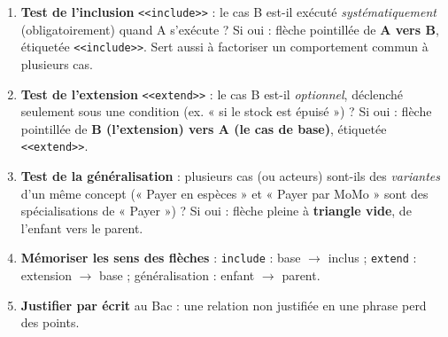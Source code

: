 \documentclass[11pt]{article}
\begin{document}
\begin{methode}
\begin{enumerate}
\item \textbf{Test de l'inclusion} \texttt{<<include>>} : le cas B est-il exécuté \emph{systématiquement} (obligatoirement) quand A s'exécute ? Si oui : flèche pointillée de \textbf{A vers B}, étiquetée \texttt{<<include>>}. Sert aussi à factoriser un comportement commun à plusieurs cas.
\item \textbf{Test de l'extension} \texttt{<<extend>>} : le cas B est-il \emph{optionnel}, déclenché seulement sous une condition (ex. « si le stock est épuisé ») ? Si oui : flèche pointillée de \textbf{B (l'extension) vers A (le cas de base)}, étiquetée \texttt{<<extend>>}.
\item \textbf{Test de la généralisation} : plusieurs cas (ou acteurs) sont-ils des \emph{variantes} d'un même concept (« Payer en espèces » et « Payer par MoMo » sont des spécialisations de « Payer ») ? Si oui : flèche pleine à \textbf{triangle vide}, de l'enfant vers le parent.
\item \textbf{Mémoriser les sens des flèches} : \texttt{include} : base $\rightarrow$ inclus ; \texttt{extend} : extension $\rightarrow$ base ; généralisation : enfant $\rightarrow$ parent.
\item \textbf{Justifier par écrit} au Bac : une relation non justifiée en une phrase perd des points.
\end{enumerate}
\end{methode}
\end{document}
